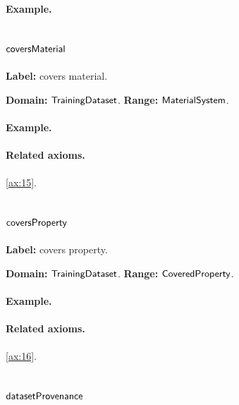 \paragraph{Example.}

\subsection{$\mathsf{coversMaterial}$}
\label{sec:term-coversMaterial}

\textbf{Label:} covers material.

\textbf{Domain:} $\mathsf{TrainingDataset}$.
\textbf{Range:} $\mathsf{MaterialSystem}$.

\paragraph{Example.}

\paragraph{Related axioms.} \eqref{ax:15}.

\subsection{$\mathsf{coversProperty}$}
\label{sec:term-coversProperty}

\textbf{Label:} covers property.

\textbf{Domain:} $\mathsf{TrainingDataset}$.
\textbf{Range:} $\mathsf{CoveredProperty}$.

\paragraph{Example.}

\paragraph{Related axioms.} \eqref{ax:16}.

\subsection{$\mathsf{datasetProvenance}$}
\label{sec:term-datasetProvenance}

